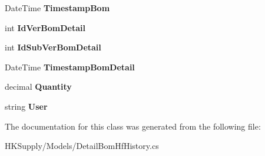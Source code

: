 \begin{DoxyCompactItemize}
\item 
\mbox{\label{class_h_k_supply_1_1_models_1_1_detail_bom_hf_history_ac28382e0a4640730b035c6af9d80420c}} 
Date\+Time {\bfseries Timestamp\+Bom}
\item 
\mbox{\label{class_h_k_supply_1_1_models_1_1_detail_bom_hf_history_ae31b6a284809ae533902af5eb7b9e246}} 
int {\bfseries Id\+Ver\+Bom\+Detail}
\item 
\mbox{\label{class_h_k_supply_1_1_models_1_1_detail_bom_hf_history_aed250dd17adbd7628ea24fc54646fb2f}} 
int {\bfseries Id\+Sub\+Ver\+Bom\+Detail}
\item 
\mbox{\label{class_h_k_supply_1_1_models_1_1_detail_bom_hf_history_a17aac9178f619126d57b8556b3e7e2de}} 
Date\+Time {\bfseries Timestamp\+Bom\+Detail}
\item 
\mbox{\label{class_h_k_supply_1_1_models_1_1_detail_bom_hf_history_a709a5b22e891da049e05be4f1d91822f}} 
decimal {\bfseries Quantity}
\item 
\mbox{\label{class_h_k_supply_1_1_models_1_1_detail_bom_hf_history_a0fb5704663537e0fde2d4337776d0a71}} 
string {\bfseries User}
\end{DoxyCompactItemize}


The documentation for this class was generated from the following file\+:\begin{DoxyCompactItemize}
\item 
H\+K\+Supply/\+Models/Detail\+Bom\+Hf\+History.\+cs\end{DoxyCompactItemize}

